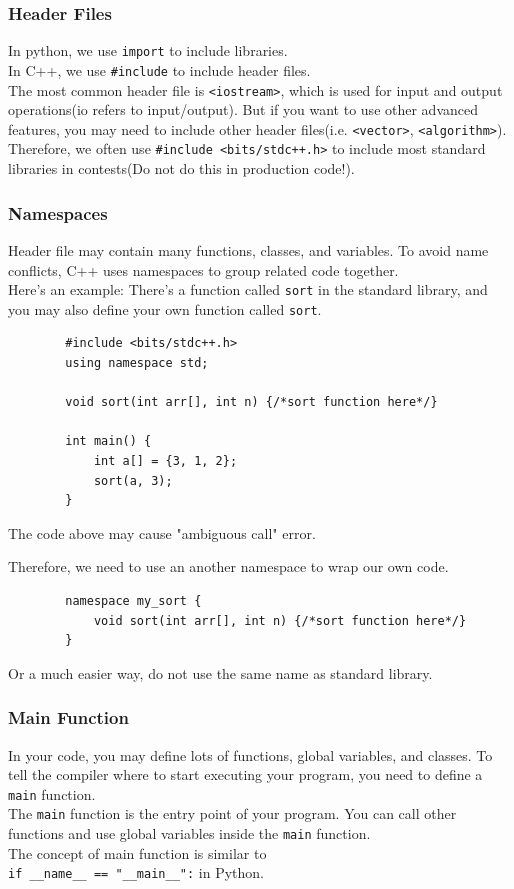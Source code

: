 \documentclass[xcolor=dvipsnames]{beamer}
\begin{document}
    \begin{frame}
        \frametitle{Header Files}
        In python, we use \texttt{import} to include libraries.\\
        In C++, we use \texttt{\#include} to include header files.\\
        The most common header file is \texttt{<iostream>}, which is used for input and output operations(io refers to input/output). But if you want to use other advanced features, you may need to include other header files(i.e. \texttt{<vector>}, \texttt{<algorithm>}). Therefore, we often use \texttt{\#include <bits/stdc++.h>} to include most standard libraries in contests(Do not do this in production code!).

    \end{frame}

    \begin{frame}[fragile]
        \frametitle{Namespaces}
        Header file may contain many functions, classes, and variables. To avoid name conflicts, C++ uses namespaces to group related code together.\\
        Here's an example:
        There's a function called \texttt{sort} in the standard library, and you may also define your own function called \texttt{sort}.
        \begin{verbatim}
        #include <bits/stdc++.h>
        using namespace std;

        void sort(int arr[], int n) {/*sort function here*/}

        int main() {
            int a[] = {3, 1, 2};
            sort(a, 3);
        }            
        \end{verbatim}
        The code above may cause "ambiguous call" error.
    \end{frame}

    \begin{frame}[fragile]
        Therefore, we need to use an another namespace to wrap our own code.
        \begin{verbatim}
        namespace my_sort {
            void sort(int arr[], int n) {/*sort function here*/}
        }
        \end{verbatim}
        Or a much easier way, do not use the same name as standard library.
    \end{frame}

    \begin{frame}
        \frametitle{Main Function}
        In your code, you may define lots of functions, global variables, and classes. To tell the compiler where to start executing your program, you need to define a \texttt{main} function.\\
        The \texttt{main} function is the entry point of your program. You can call other functions and use global variables inside the \texttt{main} function.\\
        The concept of main function is similar to\\ \texttt{if \_\_name\_\_ == "\_\_main\_\_":} in Python.
    \end{frame}
\end{document}
